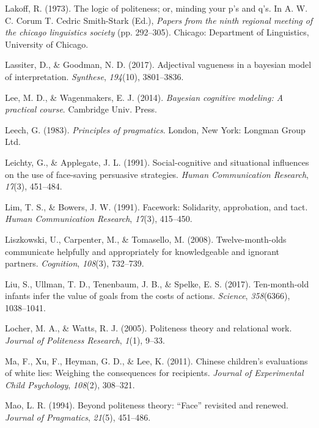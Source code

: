 \documentclass[oneside]{report}
\begin{document}
\hypertarget{ref-lakoff1973}{}
Lakoff, R. (1973). The logic of politeness; or, minding your p's and
q's. In A. W. C. Corum T. Cedric Smith-Stark (Ed.), \emph{Papers from
the ninth regional meeting of the chicago linguistics society} (pp.
292--305). Chicago: Department of Linguistics, University of Chicago.

\hypertarget{ref-lassiter2017adjectival}{}
Lassiter, D., \& Goodman, N. D. (2017). Adjectival vagueness in a
bayesian model of interpretation. \emph{Synthese}, \emph{194}(10),
3801--3836.

\hypertarget{ref-lee2014}{}
Lee, M. D., \& Wagenmakers, E. J. (2014). \emph{Bayesian cognitive
modeling: A practical course}. Cambridge Univ. Press.

\hypertarget{ref-leech1983}{}
Leech, G. (1983). \emph{Principles of pragmatics}. London, New York:
Longman Group Ltd.

\hypertarget{ref-leichty1991}{}
Leichty, G., \& Applegate, J. L. (1991). Social-cognitive and
situational influences on the use of face-saving persuasive strategies.
\emph{Human Communication Research}, \emph{17}(3), 451--484.

\hypertarget{ref-lim1991}{}
Lim, T. S., \& Bowers, J. W. (1991). Facework: Solidarity, approbation,
and tact. \emph{Human Communication Research}, \emph{17}(3), 415--450.

\hypertarget{ref-liszkowski2008}{}
Liszkowski, U., Carpenter, M., \& Tomasello, M. (2008).
Twelve-month-olds communicate helpfully and appropriately for
knowledgeable and ignorant partners. \emph{Cognition}, \emph{108}(3),
732--739.

\hypertarget{ref-liu2017ten}{}
Liu, S., Ullman, T. D., Tenenbaum, J. B., \& Spelke, E. S. (2017).
Ten-month-old infants infer the value of goals from the costs of
actions. \emph{Science}, \emph{358}(6366), 1038--1041.

\hypertarget{ref-locher2005}{}
Locher, M. A., \& Watts, R. J. (2005). Politeness theory and relational
work. \emph{Journal of Politeness Research}, \emph{1}(1), 9--33.

\hypertarget{ref-ma2011}{}
Ma, F., Xu, F., Heyman, G. D., \& Lee, K. (2011). Chinese children's
evaluations of white lies: Weighing the consequences for recipients.
\emph{Journal of Experimental Child Psychology}, \emph{108}(2),
308--321.

\hypertarget{ref-mao1994}{}
Mao, L. R. (1994). Beyond politeness theory: ``Face'' revisited and
renewed. \emph{Journal of Pragmatics}, \emph{21}(5), 451--486.
\end{document}
